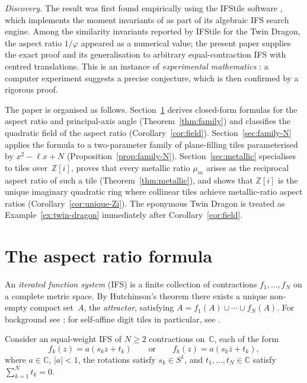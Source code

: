 \documentclass{amsart}
\theoremstyle{definition}
\theoremstyle{remark}
\begin{document}
\textit{Discovery.}
The result was first found empirically using the IFStile software
\cite{Mekhontsev2019}, which implements the moment invariants of
\cite{VrscayRoehrig1989,Vrscay1991} as part of its algebraic IFS search engine.
Among the similarity invariants reported by IFStile for the Twin Dragon, the
aspect ratio $1/\varphi$ appeared as a numerical value; the present paper supplies
the exact proof and its generalisation to arbitrary
equal-contraction IFS with centred translations.
This is an instance of \emph{experimental mathematics} \cite{BorweinBailey2004}:
a computer experiment suggests a precise conjecture, which is then confirmed
by a rigorous proof.

The paper is organised as follows.
Section~\ref{sec:family} derives closed-form formulas for the
aspect ratio and principal-axis angle
(Theorem~\ref{thm:family}) and classifies the quadratic field
of the aspect ratio (Corollary~\ref{cor:field}).
Section~\ref{sec:family-N} applies the formula to a two-parameter family of
plane-filling tiles parameterised by $x^2-\ell x+N$
(Proposition~\ref{prop:family-N}).
Section~\ref{sec:metallic} specialises to tiles over~$\mathbb{Z}[i]$,
proves that every metallic ratio $\mu_m$ arises as
the reciprocal aspect ratio of such a tile
(Theorem~\ref{thm:metallic}), and shows that $\mathbb{Z}[i]$ is the unique imaginary
quadratic ring where collinear tiles achieve metallic-ratio aspect ratios
(Corollary~\ref{cor:unique-Zi}).
The eponymous Twin Dragon is treated as Example~\ref{ex:twin-dragon}
immediately after Corollary~\ref{cor:field}.

\section{The aspect ratio formula}\label{sec:family}

An \emph{iterated function system} (IFS) is a finite collection
of contractions $f_1,\ldots,f_N$ on a complete metric space.
By Hutchinson's theorem \cite{Hutchinson1981} there exists a unique
non-empty compact set~$A$, the \emph{attractor}, satisfying
$A = f_1(A) \cup \cdots \cup f_N(A)$.
For background see \cite{Barnsley1993, Falconer2014}; for self-affine digit tiles
in particular, see \cite{Bandt1991, Kenyon1992, LagariasWang1996}.

Consider an equal-weight IFS of $N\geq 2$ contractions on~$\mathbb{C}$,
each of the form
\[
  f_k(z) = a(s_k z + t_k)
  \qquad\text{or}\qquad
  f_k(z) = a(s_k\overline{z} + t_k),
\]
where $a \in \mathbb{C}$, $|a| < 1$, the rotations satisfy
$s_k \in S^1$, and $t_1,\ldots,t_N \in \mathbb{C}$ satisfy
$\sum_{k=1}^N t_k = 0$.
\end{document}
